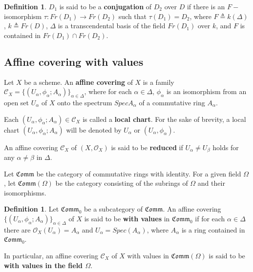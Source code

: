\documentclass[12pt,twoside,reqno]{amsart}
\theoremstyle{definition}
\newtheorem{definition}[theorem]{Definition}
\numberwithin{equation}{section}
\begin{document}
\begin{definition}
$D_{1}$ is said to be a \textbf{conjugation} of $D_{2}$ over $D$ if
there is an $F-$isomorphism $\tau:Fr(D_{1})\rightarrow
Fr(D_{2})$ such that
$
\tau(D_{1})=D_{2}$,
where $F\triangleq k(\Delta)$, $k\triangleq Fr(D)$, $\Delta$ is a transcendental basis of the field $Fr(D_{1})$ over $k$, and $F$ is contained in $Fr(D_{1})\cap Fr(D_{2})$.
\end{definition}


\subsection{Affine covering with values}

Let $X$ be a scheme. An \textbf{affine covering} of $X$ is a family $
\mathcal{C}_{X}=\{(U_{\alpha },\phi _{\alpha };A_{\alpha })\}_{\alpha \in
\Delta }$, where for each $\alpha \in \Delta $, $\phi _{\alpha }$ is an
isomorphism from an open set $U_{\alpha }$ of $X$ onto the spectrum $Spec{
A_{\alpha }}$ of a commutative ring $A_{\alpha }$.

Each $(U_{\alpha },\phi _{\alpha };A_{\alpha })\in \mathcal{C}_{X}$ is
called a \textbf{local chart}. For the sake of brevity, a local chart $
(U_{\alpha},\phi_{\alpha};A_{\alpha })$ will be denoted by $U_{\alpha}$ or $
(U_{\alpha},\phi_{\alpha})$.

An affine covering $\mathcal{C}_{X}$ of $(X, \mathcal{O}_{X})$ is said to be
\textbf{reduced} if $U_{\alpha}\neq U_{\beta} $ holds for any $\alpha\neq
\beta$ in $\Delta$.

Let $\mathfrak{Comm}$ be the category of commutative rings with identity.
For a given field $\Omega$, let $\mathfrak{Comm}(\Omega)$ be the category
consisting of the subrings of $\Omega$ and their isomorphisms.

\begin{definition}
Let $\mathfrak{Comm}_{0}$ be a subcategory of $\mathfrak{Comm}$. An affine
covering $\{(U_{\alpha},\phi_{\alpha};A_{\alpha })\}_{\alpha \in \Delta}$ of
$X$ is said to be \textbf{with values} in $\mathfrak{Comm}_{0}$ if for each $
\alpha \in \Delta$ there are $\mathcal{O}_{X}(U_{\alpha})=A_{\alpha}$ and $U_{\alpha}=Spec(A_{\alpha})$, where
 $A_{\alpha }$ is a ring contained in $\mathfrak{Comm}_{0}$.

In particular, an affine covering $\mathcal{C}_{X}$
of $X$ with values in $\mathfrak{Comm}(\Omega)$ is said to be \textbf{with
values in the field $\Omega$}.
\end{definition}
\end{document}
